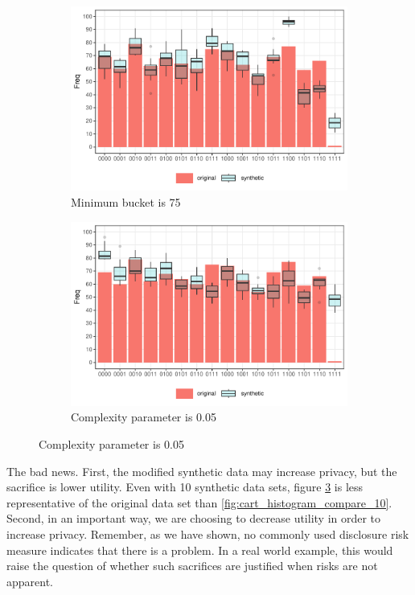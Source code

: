 \documentclass[runningheads]{llncs}
\begin{document}
\begin{figure}[!h]
    \centering
    \caption{Compare original and synthetic data}
    \begin{subfigure}{0.48\textwidth}
        \includegraphics[width=\textwidth]{../graphs/graph_cart_modified_mb_histogram_compare_10.pdf}
        \caption{Minimum bucket is 75}
        \label{fig:attacker_modified_mb}
    \end{subfigure}
    \hfill
    \begin{subfigure}{0.48\textwidth}
        \includegraphics[width=\textwidth]{../graphs/graph_cart_modified_cp_histogram_compare_10.pdf}
        \caption{Complexity parameter is 0.05}
        \label{fig:attacker_modified_cp}
    \end{subfigure}
    \label{fig:compare_modified}
\end{figure}

The bad news.  First, the modified synthetic data may increase privacy, but the sacrifice is lower utility.  Even with 10 synthetic data sets, figure \ref{fig:compare_modified} is less representative of the original data set than \ref{fig:cart_histogram_compare_10}.  Second, in an important way, we are choosing to decrease utility in order to increase privacy.  Remember, as we have shown, no commonly used disclosure risk measure indicates that there is a problem.  In a real world example, this would raise the question of whether such sacrifices are justified when risks are not apparent.
\end{document}

